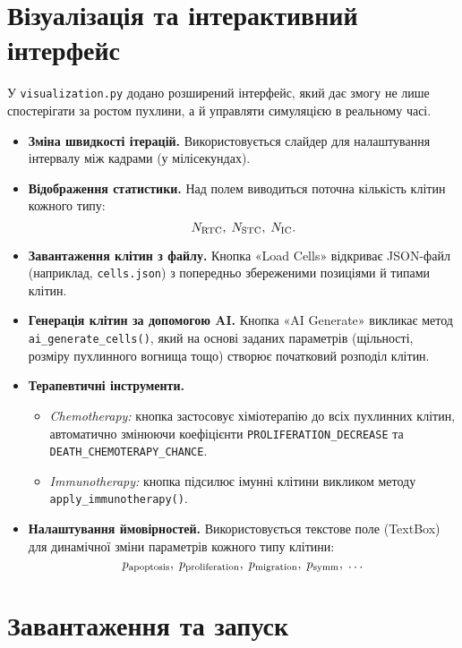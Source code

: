 \documentclass[12pt]{article}
\begin{document}
\medskip


\section{Візуалізація та інтерактивний інтерфейс}
\label{sec:visual-interface}

У \texttt{visualization.py} додано розширений інтерфейс, який дає змогу не лише спостерігати за ростом пухлини, а й управляти симуляцією в реальному часі.

\begin{itemize}
  \item \textbf{Зміна швидкості ітерацій.}  
    Використовується слайдер для налаштування інтервалу між кадрами (у мілісекундах).
  \item \textbf{Відображення статистики.}  
    Над полем виводиться поточна кількість клітин кожного типу: 
    \[
      N_{\rm RTC},\;N_{\rm STC},\;N_{\rm IC}.
    \]
  \item \textbf{Завантаження клітин з файлу.}  
    Кнопка «Load Cells» відкриває JSON-файл (наприклад, \texttt{cells.json}) з попередньо збереженими позиціями й типами клітин.
  \item \textbf{Генерація клітин за допомогою AI.}  
    Кнопка «AI Generate» викликає метод \texttt{ai\_generate\_cells()}, який на основі заданих параметрів (щільності, розміру пухлинного вогнища тощо) створює початковий розподіл клітин.
  \item \textbf{Терапевтичні інструменти.}
    \begin{itemize}
      \item \emph{Chemotherapy:} кнопка застосовує хіміотерапію до всіх пухлинних клітин, автоматично змінюючи коефіцієнти \texttt{PROLIFERATION\_DECREASE} та \texttt{DEATH\_CHEMOTERAPY\_CHANCE}.
      \item \emph{Immunotherapy:} кнопка підсилює імунні клітини викликом методу \texttt{apply\_immunotherapy()}.
    \end{itemize}
  \item \textbf{Налаштування ймовірностей.}  
    Використовується текстове поле (TextBox) для динамічної зміни параметрів кожного типу клітини:
    \[
      p_{\rm apoptosis},\;p_{\rm proliferation},\;p_{\rm migration},\;p_{\rm symm},\;\ldots
    \]
\end{itemize}


\section{Завантаження та запуск}
\end{document}
